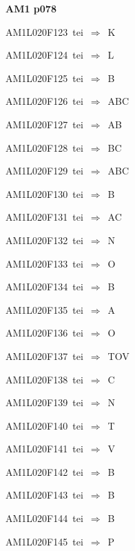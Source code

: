 \par\vfill\eject
{\bf\hfill AM1 p078\hfill\hbox{}}\par\bigskip
{\sixrm AM1L020F123\ {\sixit tei}\ }$\Rightarrow$\ K\par\smallskip
{\sixrm AM1L020F124\ {\sixit tei}\ }$\Rightarrow$\ L\par\smallskip
{\sixrm AM1L020F125\ {\sixit tei}\ }$\Rightarrow$\ B\par\smallskip
{\sixrm AM1L020F126\ {\sixit tei}\ }$\Rightarrow$\ ABC\par\smallskip
{\sixrm AM1L020F127\ {\sixit tei}\ }$\Rightarrow$\ AB\par\smallskip
{\sixrm AM1L020F128\ {\sixit tei}\ }$\Rightarrow$\ BC\par\smallskip
{\sixrm AM1L020F129\ {\sixit tei}\ }$\Rightarrow$\ ABC\par\smallskip
{\sixrm AM1L020F130\ {\sixit tei}\ }$\Rightarrow$\ B\par\smallskip
{\sixrm AM1L020F131\ {\sixit tei}\ }$\Rightarrow$\ AC\par\smallskip
{\sixrm AM1L020F132\ {\sixit tei}\ }$\Rightarrow$\ N\par\smallskip
{\sixrm AM1L020F133\ {\sixit tei}\ }$\Rightarrow$\ O\par\smallskip
{\sixrm AM1L020F134\ {\sixit tei}\ }$\Rightarrow$\ B\par\smallskip
{\sixrm AM1L020F135\ {\sixit tei}\ }$\Rightarrow$\ A\par\smallskip
{\sixrm AM1L020F136\ {\sixit tei}\ }$\Rightarrow$\ O\par\smallskip
{\sixrm AM1L020F137\ {\sixit tei}\ }$\Rightarrow$\ TOV\par\smallskip
{\sixrm AM1L020F138\ {\sixit tei}\ }$\Rightarrow$\ C\par\smallskip
{\sixrm AM1L020F139\ {\sixit tei}\ }$\Rightarrow$\ N\par\smallskip
{\sixrm AM1L020F140\ {\sixit tei}\ }$\Rightarrow$\ T\par\smallskip
{\sixrm AM1L020F141\ {\sixit tei}\ }$\Rightarrow$\ V\par\smallskip
{\sixrm AM1L020F142\ {\sixit tei}\ }$\Rightarrow$\ B\par\smallskip
{\sixrm AM1L020F143\ {\sixit tei}\ }$\Rightarrow$\ B\par\smallskip
{\sixrm AM1L020F144\ {\sixit tei}\ }$\Rightarrow$\ B\par\smallskip
{\sixrm AM1L020F145\ {\sixit tei}\ }$\Rightarrow$\ P\par\smallskip
